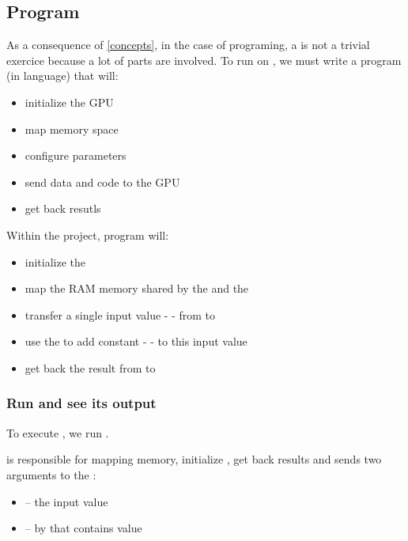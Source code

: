 \subsection{ Program}

As a consequence of \ref{concepts}, in the case of  programing, a  is not a trivial exercice because a lot of parts are involved. To run  on \vc, we must write a \cpu{} program (in  language) that will:
\begin{itemize}
	\item initialize the GPU
	\item map \ram{} memory space
	\item configure parameters
	\item send data and code to the GPU
	\item get back resutls
\end{itemize}
\vspace{10 mm}

Within the  project,  program will:

\begin{itemize}
	\item initialize the \vc
	\item map the RAM memory shared by the \vc{} and the \cpu
	\item transfer a single input value -  - from \cpu{} to \vc
	\item use the \vc{} to add constant  -  - to this input value
	\item get back the result from \vc{} to \cpu
\end{itemize}


\subsubsection{Run  and see its output}

To execute , we run .

 is responsible for mapping memory, initialize , get back results and sends two arguments to the :
\begin{itemize}
	\item {} -- the input value
	\item {} --  by \vc{} that contains  value
\end{itemize}

